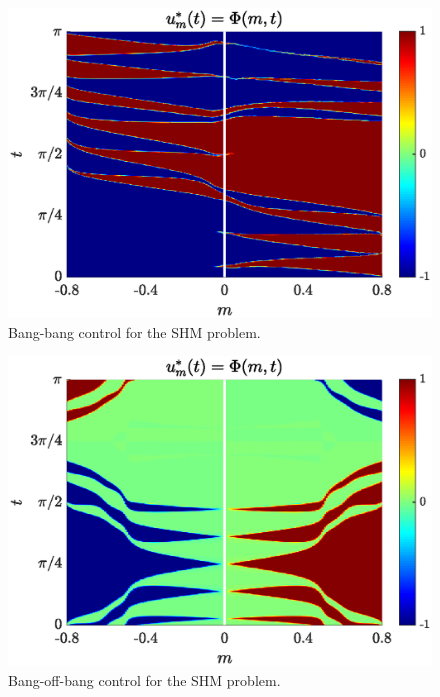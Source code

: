 \documentclass[twocolumn]{autart}    %
\begin{document}
\begin{figure}[ht!]
	\centering
	\includegraphics[scale=0.42]{img/fig05.eps}
	\caption{Bang-bang control for the SHM problem.}\label{fig:sim-bang-bang}
\end{figure} 

\begin{figure}[ht!]
	\centering
	\includegraphics[scale=0.42]{img/fig06.eps}
	\caption{Bang-off-bang control for the SHM problem.}\label{fig:sim-bang-off-bang}
\end{figure} 
\end{document}
